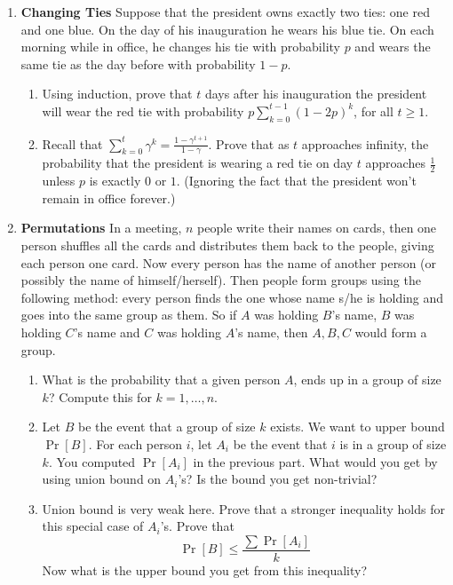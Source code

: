 \documentclass[11pt,fleqn]{article}
\begin{document}
\begin{enumerate}
\item \textbf{Changing Ties} Suppose that the president owns exactly two ties: one red and one blue.
On the day of his inauguration he wears his blue tie.
On each morning while in office, he changes his tie
with probability $p$ and wears the same tie as the day before
with probability $1 - p$.

\begin{enumerate}
\item Using induction, prove that $t$ days after his inauguration
the president will wear the red tie with probability $p \sum_{k = 0}^{t-1} (1 - 2p)^k$, for all $t \geq 1$.
\item Recall that $\sum_{k = 0}^{t} \gamma^k = \frac {1 - \gamma^{t+1}}{1 - \gamma}$.
Prove that as $t$ approaches infinity, 
the probability that the president is wearing a red tie on day $t$
approaches $\frac 12$ unless $p$ is exactly $0$ or $1$.
(Ignoring the fact that the president won't remain in office forever.)
\end{enumerate}

\item \textbf{Permutations} In a meeting, $n$ people write their names on cards, then one person shuffles all the cards and distributes them back to the people, giving each person one card. Now every person has the name of another person (or possibly the name of himself/herself). Then people form groups using the following method: every person finds the one whose name s/he is holding and goes into the same group as them. So if $A$ was holding $B$'s name, $B$ was holding $C$'s name and $C$ was holding $A$'s name, then $A, B, C$ would form a group.

\begin{enumerate}
\item What is the probability that a given person $A$, ends up in a group of size $k$? Compute this for $k=1,\dots,n$.
\item Let $B$ be the event that a group of size $k$ exists. We want to upper bound $\Pr[B]$. For each person $i$, let $A_i$ be the event that $i$ is in a group of size $k$. You computed $\Pr[A_i]$ in the previous part. What would you get by using union bound on $A_i$'s? Is the bound you get non-trivial?
\item Union bound is very weak here. Prove that a stronger inequality holds for this special case of $A_i$'s. Prove that
$$\Pr[B]\leq \frac{\sum{\Pr[A_i]}}{k}$$
Now what is the upper bound you get from this inequality?
\end{enumerate}


\end{enumerate}
\end{document}
